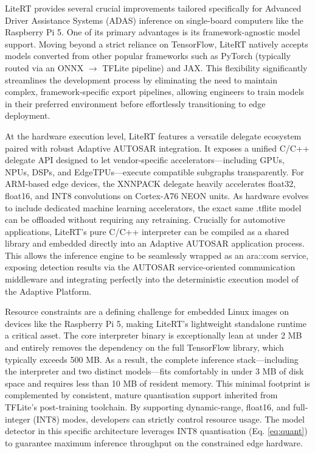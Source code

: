 
LiteRT provides several crucial improvements tailored specifically for Advanced Driver Assistance Systems (ADAS) inference on single-board computers like the Raspberry Pi 5. One of its primary advantages is its framework-agnostic model support. Moving beyond a strict reliance on TensorFlow, LiteRT natively accepts models converted from other popular frameworks such as PyTorch (typically routed via an ONNX $\to$ TFLite pipeline) and JAX. This flexibility significantly streamlines the development process by eliminating the need to maintain complex, framework-specific export pipelines, allowing engineers to train models in their preferred environment before effortlessly transitioning to edge deployment.

At the hardware execution level, LiteRT features a versatile delegate ecosystem paired with robust Adaptive AUTOSAR integration. It exposes a unified C/C++ delegate API designed to let vendor-specific accelerators—including GPUs, NPUs, DSPs, and EdgeTPUs—execute compatible subgraphs transparently. For ARM-based edge devices, the XNNPACK delegate heavily accelerates float32, float16, and INT8 convolutions on Cortex-A76 NEON units. As hardware evolves to include dedicated machine learning accelerators, the exact same .tflite model can be offloaded without requiring any retraining. Crucially for automotive applications, LiteRT's pure C/C++ interpreter can be compiled as a shared library and embedded directly into an Adaptive AUTOSAR application process. This allows the inference engine to be seamlessly wrapped as an ara::com service, exposing detection results via the AUTOSAR service-oriented communication middleware and integrating perfectly into the deterministic execution model of the Adaptive Platform.

Resource constraints are a defining challenge for embedded Linux images on devices like the Raspberry Pi 5, making LiteRT’s lightweight standalone runtime a critical asset. The core interpreter binary is exceptionally lean at under 2 MB and entirely removes the dependency on the full TensorFlow library, which typically exceeds 500 MB. As a result, the complete inference stack—including the interpreter and two distinct models—fits comfortably in under 3 MB of disk space and requires less than 10 MB of resident memory. This minimal footprint is complemented by consistent, mature quantisation support inherited from TFLite's post-training toolchain. By supporting dynamic-range, float16, and full-integer (INT8) modes, developers can strictly control resource usage. The model detector in this specific architecture leverages INT8 quantisation (Eq. \eqref{eq:quant}) to guarantee maximum inference throughput on the constrained edge hardware.

